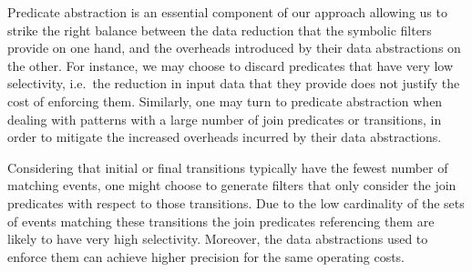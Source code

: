 Predicate abstraction is an essential component of our approach
allowing us to strike the right balance between the data reduction that the
symbolic filters provide on one hand, and the overheads introduced by their
data abstractions on the other.
For instance, we may choose to discard
predicates that have very low selectivity, i.e.\ the reduction in input 
data
that they provide does not justify the cost of enforcing them.
Similarly, one may turn to predicate abstraction when dealing with patterns
 with
a large number of join predicates or transitions, in order to mitigate the
increased overheads incurred by their data abstractions.

Considering that initial or final transitions typically have the fewest
number of matching events, one might choose to generate filters that only
consider the join predicates with respect to those transitions.
Due to the low cardinality of the sets of events matching these transitions 
the join predicates referencing them are likely to have very high 
selectivity.
Moreover, the data abstractions used to enforce them can achieve higher
precision for the same operating costs.












 
